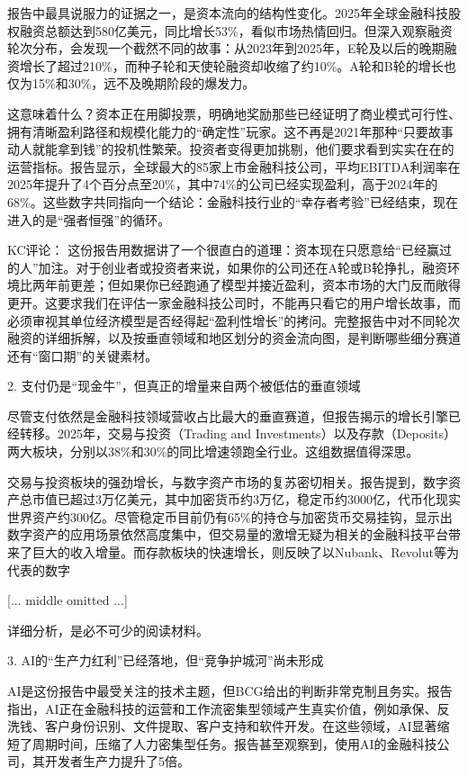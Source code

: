 \documentclass[11pt]{ctexart}
\begin{document}
报告中最具说服力的证据之一，是资本流向的结构性变化。2025年全球金融科技股权融资总额达到580亿美元，同比增长53\%，看似市场热情回归。但深入观察融资轮次分布，会发现一个截然不同的故事：从2023年到2025年，E轮及以后的晚期融资增长了超过210\%，而种子轮和天使轮融资却收缩了约10\%。A轮和B轮的增长也仅为15\%和30\%，远不及晚期阶段的爆发力。

这意味着什么？资本正在用脚投票，明确地奖励那些已经证明了商业模式可行性、拥有清晰盈利路径和规模化能力的“确定性”玩家。这不再是2021年那种“只要故事动人就能拿到钱”的投机性繁荣。投资者变得更加挑剔，他们要求看到实实在在的运营指标。报告显示，全球最大的85家上市金融科技公司，平均EBITDA利润率在2025年提升了4个百分点至20\%，其中74\%的公司已经实现盈利，高于2024年的68\%。这些数字共同指向一个结论：金融科技行业的“幸存者考验”已经结束，现在进入的是“强者恒强”的循环。

KC评论： 这份报告用数据讲了一个很直白的道理：资本现在只愿意给“已经赢过的人”加注。对于创业者或投资者来说，如果你的公司还在A轮或B轮挣扎，融资环境比两年前更差；但如果你已经跑通了模型并接近盈利，资本市场的大门反而敞得更开。这要求我们在评估一家金融科技公司时，不能再只看它的用户增长故事，而必须审视其单位经济模型是否经得起“盈利性增长”的拷问。完整报告中对不同轮次融资的详细拆解，以及按垂直领域和地区划分的资金流向图，是判断哪些细分赛道还有“窗口期”的关键素材。

2. 支付仍是“现金牛”，但真正的增量来自两个被低估的垂直领域

尽管支付依然是金融科技领域营收占比最大的垂直赛道，但报告揭示的增长引擎已经转移。2025年，交易与投资（Trading and Investments）以及存款（Deposits）两大板块，分别以38\%和30\%的同比增速领跑全行业。这组数据值得深思。

交易与投资板块的强劲增长，与数字资产市场的复苏密切相关。报告提到，数字资产总市值已超过3万亿美元，其中加密货币约3万亿，稳定币约3000亿，代币化现实世界资产约300亿。尽管稳定币目前仍有65\%的持仓与加密货币交易挂钩，显示出数字资产的应用场景依然高度集中，但交易量的激增无疑为相关的金融科技平台带来了巨大的收入增量。而存款板块的快速增长，则反映了以Nubank、Revolut等为代表的数字

[... middle omitted ...]

详细分析，是必不可少的阅读材料。

3. AI的“生产力红利”已经落地，但“竞争护城河”尚未形成

AI是这份报告中最受关注的技术主题，但BCG给出的判断非常克制且务实。报告指出，AI正在金融科技的运营和工作流密集型领域产生真实价值，例如承保、反洗钱、客户身份识别、文件提取、客户支持和软件开发。在这些领域，AI显著缩短了周期时间，压缩了人力密集型任务。报告甚至观察到，使用AI的金融科技公司，其开发者生产力提升了5倍。
\end{document}
